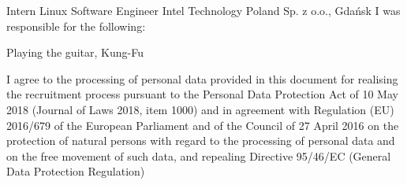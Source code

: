 \documentclass{cvClass} %
\begin{document}
   {
      \experience
        {Intern Linux Software Engineer}
        {Intel Technology Poland Sp. z o.o., Gdańsk}
        {I was responsible for the following:} {
        }
    }
  
   {Playing the guitar, Kung-Fu}

  \vfill
    {I agree to the processing of personal data provided in this document for realising the recruitment process pursuant to the Personal Data Protection Act of 10 May 2018 (Journal of Laws 2018, item 1000) and in agreement with Regulation (EU) 2016/679 of the European Parliament and of the Council of 27 April 2016 on the protection of natural persons with regard to the processing of personal data and on the free movement of such data, and repealing Directive 95/46/EC (General Data Protection Regulation)}
\end{document}
